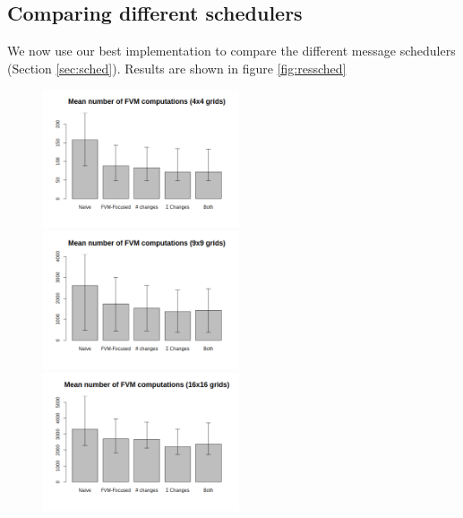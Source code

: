 \documentclass[a4paper,11pt]{report}
\begin{document}
\subsection{Comparing different schedulers}
\label{sec:ressched}

We now use our best implementation to compare the different message schedulers (Section \ref{sec:sched}). Results are shown in figure \ref{fig:ressched}

\begin{figure}[!ht]
    \centering
    \includegraphics[width=5.8cm]{../Test/results/sched_2_fvm.png}%
    \includegraphics[width=5.8cm]{../Test/results/sched_3_fvm.png}%
    \includegraphics[width=5.8cm]{../Test/results/sched_4_fvm.png}
    

\end{figure}
\end{document}
